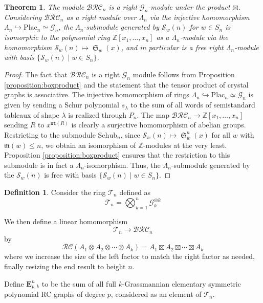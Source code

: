 \documentclass{amsart}
\newtheorem{theorem}{Theorem}[section]
\theoremstyle{definition}
\newtheorem{definition}[lemma]{Definition}
\theoremstyle{remark}
\numberwithin{equation}{subsection}
\DeclareMathOperator{\sch}{\mathfrak{S}}
\newcommand{\wtt}{\mathtt{wt}}
\newcommand{\grass}{\mathcal{G}}
\newcommand{\plac}{\mathrm{Plac}}
\newcommand{\hr}{\mathtt{ht}}
\newcommand{\BRC}{\mathcal{BRC}}
\newcommand{\RC}{\mathcal{RC}}
\newcommand{\maxd}{\mathfrak{m}}
\begin{document}
\begin{theorem} \label{theorem:schubmoduleiso}
  The module $\BRC_n$ is a right $\grass_n$-module under the product $\boxtimes$. Considering $\BRC_n$ as a right module over $\Lambda_n$ via the injective homomorphism $\Lambda_n\hookrightarrow \plac_n\simeq \grass_n$, the $\Lambda_n$-submodule generated by $\mathcal{S}_w(n)$ for $w\in S_n$ is isomorphic to the polynomial ring $\mathbb{Z}[x_1,\ldots,x_n]$ as a $\Lambda_n$-module via the homomorphism $\mathcal{S}_w(n)\mapsto\sch_w(x)$, and in particular is a free right $\Lambda_n$-module with basis $\{\mathcal{S}_w(n)\mid w\in S_n\}$.
\end{theorem}
\begin{proof}
The fact that $\BRC_n$ is a right $\grass_n$ module follows from Proposition \ref{proposition:boxproduct} and the statement that the tensor product of crystal graphs is associative. The injective homomorphism of rings $\Lambda_n\hookrightarrow \plac_n\simeq \grass_n$ is given by sending a Schur polynomial $s_\lambda$ to the sum of all words of semistandard tableaux of shape $\lambda$ is realized through $P_n$. The map $\BRC_n\to \mathbb{Z}[x_1,\ldots,x_n]$ sending $R$ to $x^{\wtt(R)}$ is clearly a surjective homomorphism of abelian groups. Restricting to the submodule $\mathrm{Schub}_n$, since $\mathcal{S}_w(n)\mapsto \sch_w^n(x)$ for all $w$ with $\maxd(w)\leq n$, we obtain an isomorphism of $\mathbb{Z}$-modules at the very least. Proposition \ref{proposition:boxproduct} ensures that the restriction to this submodule is in fact a $\Lambda_n$-isomorphism. Thus, the $\Lambda_n$-submodule generated by the $\mathcal{S}_w(n)$ is free with basis $\{\mathcal{S}_w(n)\mid w\in S_n\}$.
\end{proof}

\begin{definition}
Consider the ring $\mathcal{T}_n$ defined as
$$\mathcal{T}_n = \bigotimes_{k=1}^n \grass_k^{\otimes k}$$

We then define a linear homomorphism
$$\mathcal{T}_n\to \BRC_n$$
by
$$\RC(A_1\otimes A_2\otimes \cdots \otimes A_k) = A_1\boxtimes A_2\boxtimes \cdots \boxtimes A_k$$
where we increase the size of the left factor to match the right factor as needed, finally resizing the end result to height $n$.

Define $\mathbf{E}_{p,k}^n$ to be the sum of all full $k$-Grassmannian elementary symmetric polynomial RC graphs of degree $p$, considered as an element of $\mathcal{T}_n$.
\end{definition}
\end{document}
